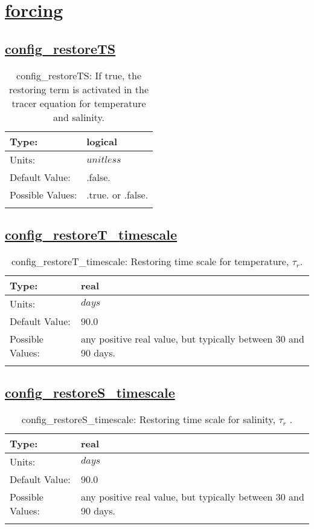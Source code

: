 \section[forcing]{\hyperref[sec:nm_tab_forcing]{forcing}}
\label{sec:nm_sec_forcing}
\subsection[config\_restoreTS]{\hyperref[sec:nm_tab_forcing]{config\_restoreTS}}
\label{subsec:nm_sec_config_restoreTS}
\begin{center}
\begin{longtable}{| p{2.0in} | p{4.0in} |}
    \hline
    Type: & logical \\
    \hline
    Units: & $unitless$ \\
    \hline
    Default Value: & .false. \\
    \hline
    Possible Values: & .true. or .false. \\
    \hline
    \caption{config\_restoreTS: If true, the restoring term is activated in the tracer equation for temperature and salinity.}
\end{longtable}
\end{center}
\subsection[config\_restoreT\_timescale]{\hyperref[sec:nm_tab_forcing]{config\_restoreT\_timescale}}
\label{subsec:nm_sec_config_restoreT_timescale}
\begin{center}
\begin{longtable}{| p{2.0in} | p{4.0in} |}
    \hline
    Type: & real \\
    \hline
    Units: & $days$ \\
    \hline
    Default Value: & 90.0 \\
    \hline
    Possible Values: & any positive real value, but typically between 30 and 90 days. \\
    \hline
    \caption{config\_restoreT\_timescale:  Restoring time scale for temperature,  $\tau_r.$ }
\end{longtable}
\end{center}
\subsection[config\_restoreS\_timescale]{\hyperref[sec:nm_tab_forcing]{config\_restoreS\_timescale}}
\label{subsec:nm_sec_config_restoreS_timescale}
\begin{center}
\begin{longtable}{| p{2.0in} | p{4.0in} |}
    \hline
    Type: & real \\
    \hline
    Units: & $days$ \\
    \hline
    Default Value: & 90.0 \\
    \hline
    Possible Values: & any positive real value, but typically between 30 and 90 days. \\
    \hline
    \caption{config\_restoreS\_timescale:  Restoring time scale for salinity,  $\tau_r$ .}
\end{longtable}
\end{center}
